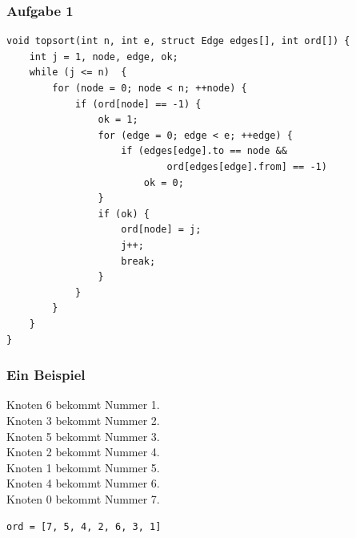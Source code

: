 \documentclass{beamer}
\newcommand*{\ttfamilywithbold}{\fontfamily{lmtt}\selectfont}
\begin{document}
\begin{frame}[fragile] \frametitle{Aufgabe 1}
	\small
	\begin{lstlisting}[style=notebook, basicstyle=\scriptsize\ttfamilywithbold]
void topsort(int n, int e, struct Edge edges[], int ord[]) {
	int j = 1, node, edge, ok;
	while (j <= n) 	{
		for (node = 0; node < n; ++node) {
			if (ord[node] == -1) {
				ok = 1;
				for (edge = 0; edge < e; ++edge) {
					if (edges[edge].to == node &&
							ord[edges[edge].from] == -1)
						ok = 0;
				}
				if (ok) {
					ord[node] = j;
					j++;
					break;
				}
			}
		}
	}
}
	\end{lstlisting}
\end{frame}

\begin{frame}[fragile] \frametitle{Ein Beispiel}
	\small
	\begin{minipage}{\dimexpr0.5\linewidth-\fboxrule-\fboxsep}
		\begin{center}
		\end{center}
	\end{minipage}
	\pause
	\begin{minipage}{\dimexpr0.5\linewidth-\fboxrule-\fboxsep}
		Knoten 6 bekommt Nummer 1. \\
		Knoten 3 bekommt Nummer 2. \\
		Knoten 5 bekommt Nummer 3. \\
		Knoten 2 bekommt Nummer 4. \\
		Knoten 1 bekommt Nummer 5. \\
		Knoten 4 bekommt Nummer 6. \\
		Knoten 0 bekommt Nummer 7. 		
	\end{minipage}
	
	\bigskip
	\centering \pause
	
	
	\bigskip
	
	\texttt{ord = [7, 5, 4, 2, 6, 3, 1]}
	
\end{frame}
\end{document}

